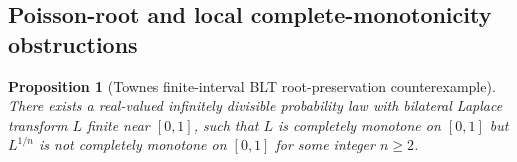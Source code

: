 \documentclass[11pt]{article}
\numberwithin{equation}{section}
\newtheorem{proposition}[theorem]{Proposition}
\theoremstyle{definition}
\theoremstyle{remark}
\newcommand{\1}{\mathbf 1}
\begin{document}
\subsection{Poisson-root and local complete-monotonicity obstructions}
\begin{proposition}[Townes finite-interval BLT root-preservation counterexample]
\label{res:townes-finiteinterval-blt-root-counterexample}
There exists a real-valued infinitely divisible probability law with bilateral Laplace transform \(L\) finite near \([0,1]\), such that \(L\) is completely monotone on \([0,1]\) but \(L^{1/n}\) is not completely monotone on \([0,1]\) for some integer \(n\ge2\).
\end{proposition}
\end{document}
